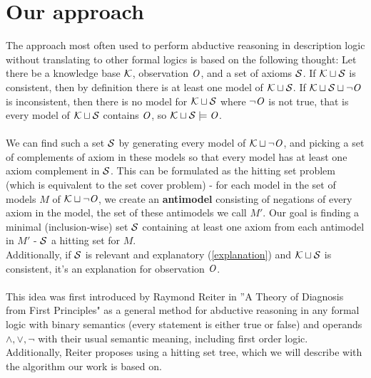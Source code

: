 \chapter{Our approach}\label{chap:proposal}
The approach most often used to perform abductive reasoning in description logic without translating to other formal logics is based on the following thought:
Let there be a knowledge base $\K$, observation $\Obs$, and a set of axioms $\S$. If $\K \sqcup \S$ is consistent, then by definition there is at least one model of $\K \sqcup \S$.  If $\K \sqcup \S \sqcup \neg \Obs$ is inconsistent, then there is no model for $\K \sqcup \S$ where $\neg \Obs$ is not true, that is every model of $\K \sqcup \S$ contains $\Obs$, so $\K \sqcup \S \models \Obs$. \\ \\
We can find such a set $\S$ by generating every model of $\K \sqcup \neg \Obs$, and picking a set of complements of axiom in these models so that every model has at least one axiom complement in $\S$. This can be formulated as the hitting set problem (which is equivalent to the set cover problem) - for each model in the set of models $M$ of  $\K \sqcup \neg \Obs$, we create an \textbf{antimodel} consisting of negations of every axiom in the model, the set of these antimodels we call $M'$. Our goal is finding a minimal (inclusion-wise) set $\S$ containing at least one axiom from each antimodel in $M'$ - $\S$ a hitting set for $M$.
\\

Additionally, if $\S$ is relevant and explanatory (\ref{explanation}) and $\K \sqcup \S$ is consistent, it's an explanation for observation $\Obs$.
\\ \\
This idea was first introduced by Raymond Reiter in ''A Theory of Diagnosis from First Principles" \cite{Reiter1987} as a general method for abductive reasoning in any formal logic with binary semantics (every statement is either true or false) and operands $\land , \lor, \neg$  with their usual semantic meaning, including first order logic. Additionally, Reiter proposes using a hitting set tree, which we will describe with the algorithm our work is based on.


